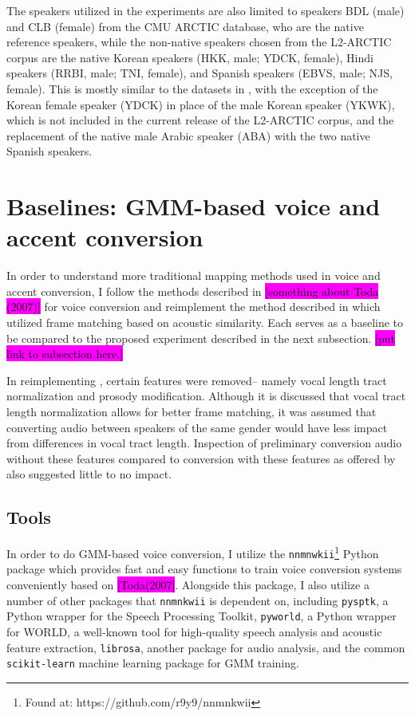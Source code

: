 \documentclass
[
    a4paper,
    twoside,
    12pt,
]
{report}
\begin{document}
The speakers utilized in the experiments are also limited to speakers
BDL (male) and CLB (female) from the CMU ARCTIC database, who are the
native reference speakers, while the non-native speakers chosen from the
L2-ARCTIC corpus are the native Korean speakers (HKK, male; YDCK,
female), Hindi speakers (RRBI, male; TNI, female), and Spanish speakers
(EBVS, male; NJS, female). This is mostly similar to the datasets in
\textcite{zhao2018a}, with the exception of the Korean female speaker
(YDCK) in place of the male Korean speaker (YKWK), which is not included
in the current release of the L2-ARCTIC corpus, and the replacement of
the native male Arabic speaker (ABA) with the two native Spanish
speakers.

\hypertarget{baselines-gmm-based-voice-and-accent-conversion}{%
\section{Baselines: GMM-based voice and accent
conversion}\label{baselines-gmm-based-voice-and-accent-conversion}}

In order to understand more traditional mapping methods used in voice
and accent conversion, I follow the methods described in
\colorbox{magenta}{[something about Toda (2007)]} for voice conversion
and reimplement the method described in \textcite{aryal2014} which
utilized frame matching based on acoustic similarity. Each serves as a
baseline to be compared to the proposed experiment described in the next
subsection. \colorbox{magenta}{[put link to subsection here.]}

In reimplementing \textcite{aryal2014}, certain features were removed--
namely vocal length tract normalization and prosody modification.
Although it is discussed that vocal tract length normalization allows
for better frame matching, it was assumed that converting audio between
speakers of the same gender would have less impact from differences in
vocal tract length. Inspection of preliminary conversion audio without
these features compared to conversion with these features as offered by
\textcite{zhao2018a} also suggested little to no impact.

\hypertarget{tools}{%
\subsection{Tools}\label{tools}}

In order to do GMM-based voice conversion, I utilize the
\texttt{nnmnwkii}\footnote{Found at: https://github.com/r9y9/nnmnkwii}
Python package which provides fast and easy functions to train voice
conversion systems conveniently based on
\colorbox{magenta}{[Toda(2007]}. Alongside this package, I also utilize
a number of other packages that \texttt{nnmnkwii} is dependent on,
including \texttt{pysptk}, a Python wrapper for the Speech Processing
Toolkit, \texttt{pyworld}, a Python wrapper for WORLD, a well-known tool
for high-quality speech analysis and acoustic feature extraction,
\texttt{librosa}, another package for audio analysis, and the common
\texttt{scikit-learn} machine learning package for GMM training.
\end{document}
